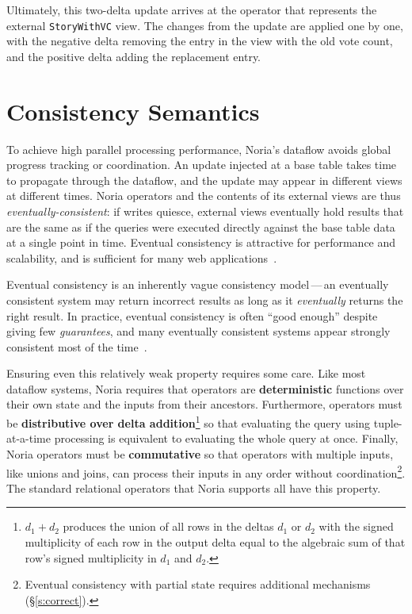 Ultimately, this two-delta update arrives at the operator that represents the
external \texttt{StoryWithVC} view. The changes from the update are applied one
by one, with the negative delta removing the entry in the view with the old vote
count, and the positive delta adding the replacement entry.

\section{Consistency Semantics}
\label{s:noria:consistency}

To achieve high parallel processing performance, Noria's dataflow avoids
global progress tracking or coordination. An update injected at a base table
takes time to propagate through the dataflow, and the update may appear in
different views at different times. Noria operators and the contents of its
external views are thus \emph{eventually-consistent}: if writes quiesce,
external views eventually hold results that are the same as if the queries were
executed directly against the base table data at a single point in time.
Eventual consistency is attractive for performance and scalability, and is
sufficient for many web applications~\cite{eventually-consistent,
facebook-memcache, pnuts}.


Eventual consistency is an inherently vague consistency model\,---\,an
eventually consistent system may return incorrect results as long as it
\emph{eventually} returns the right result. In practice, eventual consistency is
often ``good enough'' despite giving few \emph{guarantees}, and many eventually
consistent systems appear strongly consistent most of the time~\cite{eventual}.

Ensuring even this relatively weak property requires some care. Like most
dataflow systems, Noria requires that operators are \textbf{deterministic}
functions over their own state and the inputs from their ancestors. Furthermore,
operators must be \textbf{distributive over delta addition}\footnote{$d_1 + d_2$
produces the union of all rows in the deltas $d_1$ or $d_2$ with the signed
multiplicity of each row in the output delta equal to the algebraic sum of that
row's signed multiplicity in $d_1$ and $d_2$.} so that evaluating the query
using tuple-at-a-time processing is equivalent to evaluating the whole query at
once. Finally, Noria operators must be \textbf{commutative} so that operators
with multiple inputs, like unions and joins, can process their inputs in any
order without coordination\footnote{Eventual consistency with partial state
requires additional mechanisms (\S\ref{s:correct}).}. The standard relational
operators that Noria supports all have this property.

